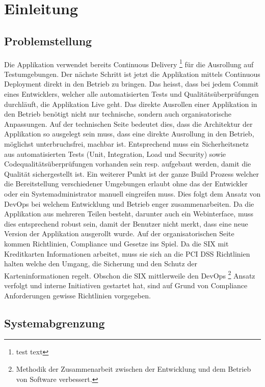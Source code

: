 \chapter{Einleitung}

\section{Problemstellung}

Die Applikation verwendet bereits Continuous Delivery \footnote{test text} für die Ausrollung auf Testumgebungen. Der nächste Schritt ist jetzt die Applikation mittels Continuous Deployment direkt in den Betrieb zu bringen. Das heisst, dass bei jedem Commit eines Entwicklers, welcher alle automatisierten Tests und Qualitätsüberprüfungen durchläuft, die Applikation Live geht.
Das direkte Ausrollen einer Applikation in den Betrieb benötigt nicht nur technische, sondern auch organisatorische Anpassungen. 
Auf der technischen Seite bedeutet dies, dass die Architektur der Applikation so ausgelegt sein muss, dass eine direkte Ausrollung in den Betrieb, möglichst unterbruchsfrei, machbar ist. Entsprechend muss ein Sicherheitsnetz aus automatisierten Tests (Unit, Integration, Load und Security) sowie Codequalitätsüberprüfungen vorhanden sein resp. aufgebaut werden, damit die Qualität sichergestellt ist. Ein weiterer Punkt ist der ganze Build Prozess welcher die Bereitstellung verschiedener Umgebungen erlaubt ohne das der Entwickler oder ein Systemadministrator manuell eingreifen muss. Dies folgt dem Ansatz von DevOps bei welchem Entwicklung und Betrieb enger zusammenarbeiten. Da die Applikation aus mehreren Teilen besteht, darunter auch ein Webinterface, muss dies entsprechend robust sein, damit der Benutzer nicht merkt, dass eine neue Version der Applikation ausgerollt wurde.
Auf der organisatorischen Seite kommen Richtlinien, Compliance und Gesetze ins Spiel. Da die SIX mit Kreditkarten Informationen arbeitet, muss sie sich an die PCI DSS Richtlinien halten welche den Umgang, die Sicherung und den Schutz der Karteninformationen regelt. Obschon die SIX mittlerweile den DevOps \footnote{Methodik der Zusammenarbeit zwischen der Entwicklung und dem Betrieb von Software verbessert. } Ansatz verfolgt und interne Initiativen gestartet hat, sind auf Grund von Compliance Anforderungen gewisse Richtlinien vorgegeben.

\section{Systemabgrenzung}

